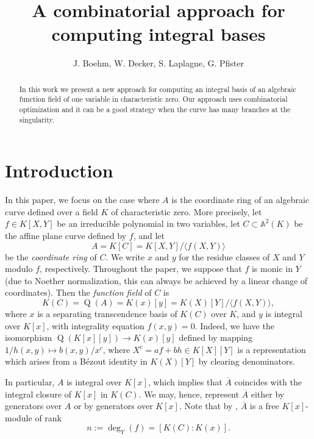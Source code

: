 \documentclass[a4paper,11pt]{amsart}%
\theoremstyle{definition}
\theoremstyle{plain}
\theoremstyle{remark}
\DeclareMathOperator{\TQR}{Q}
\begin{document}
\title[Combinatorial approach for integral bases]{A combinatorial approach for computing integral bases}
\author{J. Boehm, W. Decker, S. Laplagne, G. Pfister}

\begin{abstract}
In this work we present a new approach for computing an integral basis of an algebraic function field of one variable in characteristic zero. Our approach uses combinatorial optimization and it can be a good strategy when the curve has many branches at the singularity.
\end{abstract}
\maketitle

\section{Introduction}
\label{section:introduction}

In this paper, we focus on  the case where $A$ is the coordinate ring
of an algebraic curve defined over a field $K$ of characteristic zero.
More precisely, let $f\in K[X,Y]$ be an irreducible polynomial
in two variables, let $C\subset\mathbb{A}^{2}(K)$ be the affine plane curve
defined by $f$, and let
\[
A=K[C]=K[X,Y]/\langle f(X,Y)\rangle
\]
be the {\emph{coordinate ring}} of $C$. We write $x$ and $y$ for the residue
classes of $X$ and $Y$ modulo $f$, respectively. Throughout the paper, we
suppose that $f$ is monic in $Y$ (due to Noether normalization, this can
always be achieved by a linear change of coordinates). Then the
{\emph{function field}} of $C$ is
\[
K(C)=\TQR(A)=K(x)[y]=K(X)[Y]/\langle f(X,Y)\rangle,
\]
where $x$ is a separating transcendence basis of $K(C)$ over $K$, and $y$ is
integral over $K[x]$, with integrality equation $f(x,y)=0$.
Indeed, we have the isomorphism $\TQR(K[x][y]) \rightarrow  K(x)[y]$ defined by
mapping $1/h(x,y) \mapsto b(x,y) / x^c$, where $X^c = a f + b h\in K[X][Y]$
is a representation which arises from a B\'ezout identity in $K(X)[Y]$ by clearing denominators.

In particular, $A$
is integral over $K[x]$, which implies that $\overline{A}$ coincides with the
integral closure of $K[x]$ in $K(C)$. We may, hence,
represent $\overline{A}$ either by generators over $A$ or by generators over
$K[x]$. Note that by \cite[Remark 2]{intbas}, $\overline{A}$
is a free $K[x]$-module of rank
\[
n:=\deg_{Y}(f)=[K(C):K(x)].
\]
\end{document}
